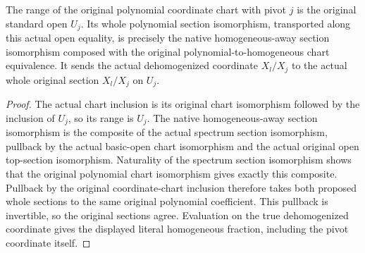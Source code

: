 \begin{theorem}
\label{thm:seven-original-projective-homogeneous-chart-route}
\leanok
{}
The range of the original polynomial coordinate chart with pivot $j$
is the original standard open $U_j$. Its whole polynomial section
isomorphism, transported along this actual open equality, is precisely
the native homogeneous-away section isomorphism composed with the
original polynomial-to-homogeneous chart equivalence. It sends the
actual dehomogenized coordinate $X_l/X_j$ to the actual whole original
section $X_l/X_j$ on $U_j$.
\end{theorem}
\begin{proof}
The actual chart inclusion is its original chart isomorphism followed
by the inclusion of $U_j$, so its range is $U_j$. The native
homogeneous-away section isomorphism is the composite of the actual
spectrum section isomorphism, pullback by the actual basic-open chart
isomorphism and the actual original open top-section isomorphism.
Naturality of the spectrum section isomorphism shows that the original
polynomial chart isomorphism gives exactly this composite. Pullback by
the original coordinate-chart inclusion therefore takes both proposed
whole sections to the same original polynomial coefficient. This
pullback is invertible, so the original sections agree. Evaluation on
the true dehomogenized coordinate gives the displayed literal
homogeneous fraction, including the pivot coordinate itself.
\end{proof}

